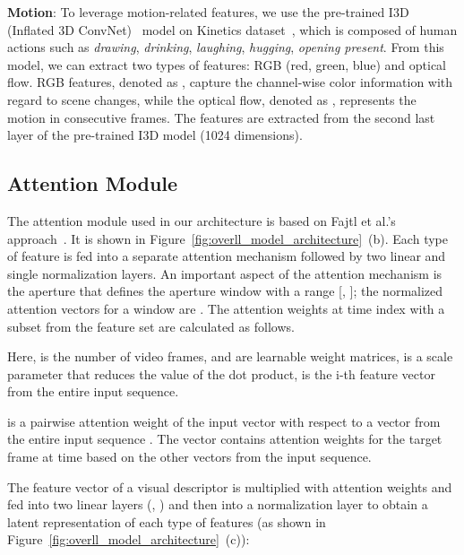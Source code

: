 \documentclass{article}
\begin{document}
\noindent
\textbf{Motion}: To leverage motion-related features, we use the pre-trained I3D (Inflated 3D ConvNet)~\cite{DBLP:conf/cvpr/CarreiraZ17} model on Kinetics dataset~\cite{kinetics_dataset}, which is composed of human actions such as \textit{drawing}, \textit{drinking}, \textit{laughing}, \textit{hugging}, \textit{opening present}. From this model, we can extract two types of features: RGB (red, green, blue) and optical flow. RGB features, denoted as , capture the channel-wise color information with regard to scene changes, while the optical flow, denoted as , represents the motion in consecutive frames. The features are extracted from the second last layer of the pre-trained I3D model (\num{1024} dimensions).

\subsection{Attention Module}
The attention module used in our architecture is based on Fajtl et al.'s approach~\cite{DBLP:conf/accv/FajtlSAMR18}. It is shown in Figure~\ref{fig:overll_model_architecture}~(b). Each type of feature is fed into a separate attention mechanism followed by two linear and single normalization layers. An important aspect of the attention mechanism is the aperture  that defines the aperture window with a range [\text{-}, \text{+}]; the normalized attention vectors for a window are . The attention weights at time index  with a subset from the feature set  are calculated as follows.

					 


			 
							   
			  


																																																										 

			  
																					   
Here,  is the number of video frames,  and  are learnable weight matrices,  is a scale parameter that reduces the value of the dot product,  is the i-th feature vector from the entire input sequence.



 is a pairwise attention weight of the input vector  with respect to a vector from the entire input sequence . The vector  contains attention weights for the target frame at time  based on the other vectors from the input sequence.


The feature vector of a visual descriptor is multiplied with attention weights and fed into two linear layers (, ) and then into a normalization layer to obtain a latent representation  of each type of features (as shown in Figure~\ref{fig:overll_model_architecture}~(c)): 
\end{document}
